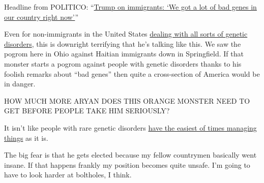 Headline from POLITICO:
``\href{https://www.politico.com/news/2024/10/07/trump-immigrants-crime-00182702}{Trump
on immigrants: `We got a lot of bad genes in our country right now'}''

Even for non-immigrants in the United States
\href{https://www.cdc.gov/genomics-and-health/about/genetic-disorders.html}{dealing
with all sorts of genetic disorders}, this is downright terrifying that
he's talking like this. We saw the pogrom here in Ohio against Haitian
immigrants down in Springfield. If that monster starts a pogrom against
people with genetic disorders thanks to his foolish remarks about ``bad
genes'' then quite a cross-section of America would be in danger.

HOW MUCH MORE ARYAN DOES THIS ORANGE MONSTER NEED TO GET BEFORE PEOPLE
TAKE HIM SERIOUSLY?

It isn't like people with rare genetic disorders
\href{https://www.ncbi.nlm.nih.gov/books/NBK1488/\#_phts_Management_}{have
the easiest of times managing things} as it is.

The big fear is that he gets elected because my fellow countrymen
basically went insane. If that happens frankly my position becomes quite
unsafe. I'm going to have to look harder at boltholes, I think.

